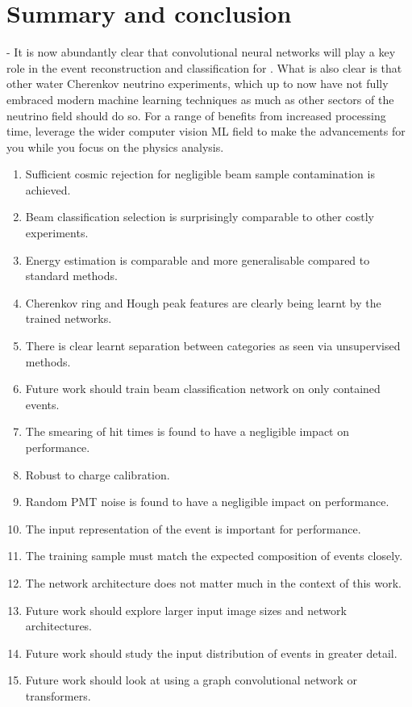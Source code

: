\chapter{Summary and conclusion} %
\label{chap:conclusion} %

- It is now abundantly clear that convolutional neural networks will play a key role in the event
reconstruction and classification for \chips. What is also clear is that other water Cherenkov
neutrino experiments, which up to now have not fully embraced modern machine learning techniques
as much as other sectors of the neutrino field should do so. For a range of benefits from
increased processing time, leverage the wider computer vision ML field to make the advancements
for you while you focus on the physics analysis.

\begin{enumerate}
    \item Sufficient cosmic rejection for negligible beam sample contamination is achieved.
    \item Beam classification selection is surprisingly comparable to other costly experiments.
    \item Energy estimation is comparable and more generalisable compared to standard methods.
    \item Cherenkov ring and Hough peak features are clearly being learnt by the trained networks.
    \item There is clear learnt separation between categories as seen via unsupervised methods.
    \item Future work should train beam classification network on only contained events.
    \item The smearing of hit times is found to have a negligible impact on performance.
    \item Robust to charge calibration.
    \item Random PMT noise is found to have a negligible impact on performance.
    \item The input representation of the event is important for performance.
    \item The training sample must match the expected composition of events closely.
    \item The network architecture does not matter much in the context of this work.
    \item Future work should explore larger input image sizes and network architectures.
    \item Future work should study the input distribution of events in greater detail.
    \item Future work should look at using a graph convolutional network or transformers.
\end{enumerate}

